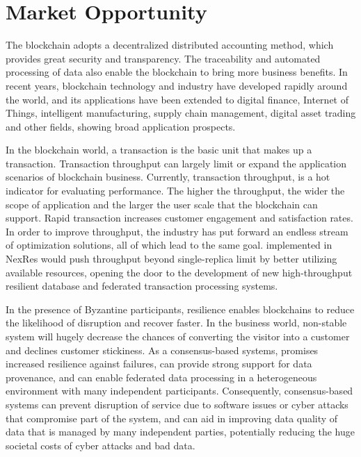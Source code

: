\section{Market Opportunity}
\par The blockchain adopts a decentralized distributed accounting method, which provides great security 
and transparency. The traceability and automated processing of data also enable the blockchain to 
bring more business benefits. In recent years, blockchain technology and industry have developed 
rapidly around the world\cite{bitcoin, ethereum, hotstuff}, and its applications have been extended 
to digital finance, Internet of Things, intelligent manufacturing, supply chain management, digital 
asset trading and other fields, showing broad application prospects\cite{gupta2021fault}.

\par In the blockchain world, a transaction is the basic unit that makes up a transaction. Transaction 
throughput can largely limit or expand the application scenarios of blockchain business. Currently, 
transaction throughput, is a hot indicator for evaluating performance. The higher the throughput, 
the wider the scope of application and the larger the user scale that the blockchain can support. 
Rapid transaction increases customer engagement and satisfaction rates. In order to improve throughput, 
the industry has put forward an endless stream of optimization solutions, all of which lead to the same 
goal. \RCC{}\cite{rcc} implemented in NexRes would push throughput beyond single-replica limit by better 
utilizing available resources, opening the door to the development of new high-throughput resilient 
database and federated transaction processing systems.

\par In the presence of Byzantine participants\cite{lao2020survey}, resilience enables blockchains to 
reduce the likelihood of disruption and recover faster. In the business 
world, non-stable system will hugely decrease the chances of converting the visitor into a customer 
and declines customer stickiness. As a consensus-based systems, \RCC{} promises increased resilience against 
failures, can provide strong support for data provenance, and can enable federated data processing in a 
heterogeneous environment with many independent participants. Consequently, consensus-based systems can 
prevent disruption of service due to software issues or cyber attacks that compromise part of the system, 
and can aid in improving data quality of data that is managed by many independent parties, potentially 
reducing the huge societal costs of cyber attacks and bad data.
